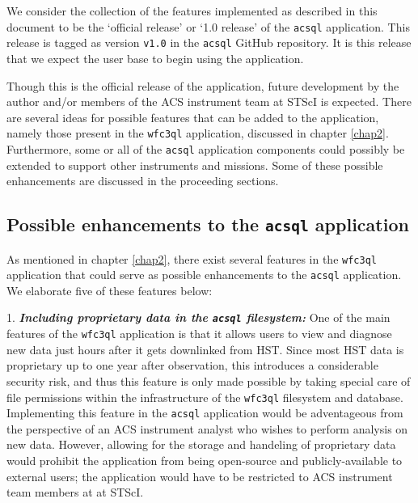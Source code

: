 \documentclass[10pt,journal,compsoc]{IEEEtran}
\begin{document}
We consider the collection of the features implemented as described in this document to be the `official release' or `1.0 release' of the \texttt{acsql} application.  This release is tagged as
version \texttt{v1.0} in the \texttt{acsql} GitHub repository.  It is this release that we expect the user base to begin using the application.

Though this is the official release of the application, future development by the author and/or members of the ACS instrument team at STScI is expected.  There are several ideas for possible
features that can be added to the application, namely those present in the \texttt{wfc3ql} application, discussed in chapter \ref{chap2}.  Furthermore, some or all of the \texttt{acsql} application
components could possibly be extended to support other instruments and missions.  Some of these possible enhancements are discussed in the proceeding sections.


\subsection{Possible enhancements to the \texttt{acsql} application} \label{sec5.1}

As mentioned in chapter \ref{chap2}, there exist several features in the \texttt{wfc3ql} application that could serve as possible enhancements to the \texttt{acsql} application.  We elaborate five of
these features below:

1. \textbf{\textit{Including proprietary data in the \texttt{acsql} filesystem:}}  One of the main features of the \texttt{wfc3ql} application is that it allows users to view and diagnose new data
just hours after it gets downlinked from HST.  Since most HST data is proprietary up to one year after observation, this introduces a considerable security risk, and thus this feature is only made
possible by taking special care of file permissions within the infrastructure of the \texttt{wfc3ql} filesystem and database.  Implementing this feature in the \texttt{acsql} application would be
adventageous from the perspective of an ACS instrument analyst who wishes to perform analysis on new data.  However, allowing for the storage and handeling of proprietary data would prohibit the
application from being open-source and publicly-available to external users; the application would have to be restricted to ACS instrument team members at at STScI.
\end{document}
